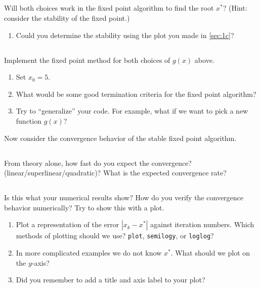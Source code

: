 \documentclass[11pt,letterpaper]{article}
\begin{document}
\subsection{}
Will both choices work in the fixed point algorithm to find the root $x^*$? (Hint: consider the stability of the fixed point.)
\begin{enumerate}
    \item Could you determine the stability using the plot you made in \ref{sec:1c}?
\end{enumerate}

\subsection{}
Implement the fixed point method for both choices of $g(x)$ above. 
\begin{enumerate}
    \item Set $x_0 = 5$.
    \item What would be some good termination criteria for the fixed point algorithm?
    \item Try to ``generalize'' your code. For example, what if we want to pick a new function $g(x)$?
\end{enumerate}

Now consider the convergence behavior of the stable fixed point algorithm. 

\subsection{}
From theory alone, how fast do you expect the convergence? (linear/superlinear/quadratic)? What is the expected convergence rate?

\subsection{}
Is this what your numerical results show? How do you verify the convergence behavior numerically? Try to show this with a plot. 
\begin{enumerate}
    \item Plot a representation of the error $|x_k-x^*|$ against iteration numbers. Which methods of plotting should we use? \texttt{plot}, \texttt{semilogy}, or \texttt{loglog}?
    \item In more complicated examples we do not know $x^*$. What should we plot on the $y$-axis?
    \item Did you remember to add a title and axis label to your plot?
\end{enumerate}
\end{document}
